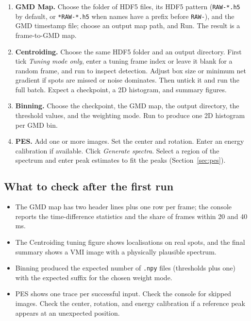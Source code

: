 \documentclass[11pt,a4paper]{article}
\newcommand{\code}[1]{\texttt{#1}}
\begin{document}
\begin{enumerate}
  \item \textbf{GMD Map.} Choose the folder of HDF5 files, its HDF5
        pattern (\code{RAW-\allowbreak{}*.\allowbreak{}h5} by default, or
        \code{*RAW-\allowbreak{}*.\allowbreak{}h5} when names have a prefix before
        \code{RAW-}), and the GMD timestamp file; choose an output map path,
        and Run. The result is a frame-to-GMD map.
  \item \textbf{Centroiding.} Choose the same HDF5 folder and an output
        directory. First tick \emph{Tuning mode only}, enter a tuning frame
        index or leave it blank for a random frame, and run to inspect
        detection. Adjust box size or minimum net gradient
        if spots are missed or noise dominates. Then untick it and run the
        full batch. Expect a checkpoint, a 2D histogram, and summary figures.
  \item \textbf{Binning.} Choose the checkpoint, the GMD map, the output
        directory, the threshold values, and the weighting mode. Run to
        produce one 2D histogram per GMD bin.
  \item \textbf{PES.} Add one or more images. Set the center and rotation.
        Enter an energy calibration if available. Click \emph{Generate
        spectra}. Select a region of the spectrum and enter peak estimates
        to fit the peaks (Section~\ref{sec:pes}).
\end{enumerate}

\subsection{What to check after the first run}

\begin{itemize}
  \item The GMD map has two header lines plus one row per frame; the console
        reports the time-difference statistics and the share of frames within
        20 and 40\,ms.
  \item The Centroiding tuning figure shows localisations on real spots, and
        the final summary shows a VMI image with a physically plausible
        spectrum.
  \item Binning produced the expected number of \code{.\allowbreak{}npy} files
        (thresholds plus one) with the expected suffix for the chosen weight
        mode.
  \item PES shows one trace per successful input. Check the console for
        skipped images. Check the center, rotation, and energy calibration
        if a reference peak appears at an unexpected position.
\end{itemize}
\end{document}
